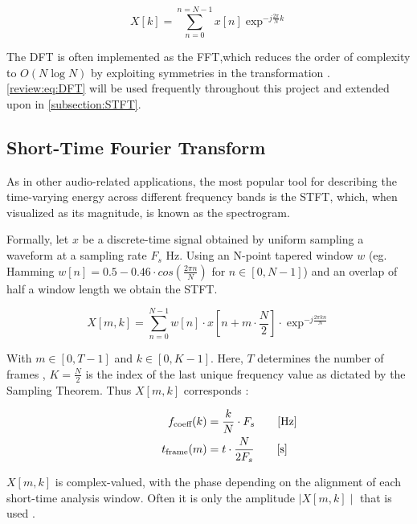 \begin{equation}
  X[k] =\sum_{n=0}^{n=N-1} x[n] \exp^{-j \frac{2 \pi}{N} k }
  \label{review:eq:DFT}
\end{equation}

The \ac{DFT} is often implemented as the \ac{FFT},which reduces the
order of complexity to $O(N\log{N})$ by exploiting symmetries in the
transformation \cite{OppenheimDSP}. \autoref{review:eq:DFT} will be used
frequently throughout this project and extended upon in
\autoref{subsection:STFT}.

\subsection{Short-Time Fourier Transform}
\label{subsection:STFT}

As in other audio-related applications, the most popular tool for describing the
time-varying energy across different frequency bands is the \ac{STFT}, which,
when visualized as its magnitude, is known as the spectrogram.

Formally, let $x$ be a discrete-time signal obtained by uniform sampling a
waveform at a sampling rate $F_{s}$ Hz. Using an N-point tapered window $w$ (eg.
Hamming $w[n] = 0.5-0.46\cdot cos(\frac{2\pi n}{N})$ for
$n\in\left[0,N-1\right]$) and an overlap of half a window length we obtain the
STFT.

\begin{equation}
  X [m,k] = \sum_{n=0}^{N-1}w[n]\cdot x[n + m\cdot\frac{N}{2}]\cdot \exp^{-j\frac{2\pi k n }{N}}
\end{equation}

With $m\in\left[0,T-1\right]$ and $k\in\left[0,K-1\right]$. Here, $T$ determines
the number of frames , $K = \frac{N}{2}$ is the index of the last unique
frequency value as dictated by the Sampling Theorem. Thus $X[m,k]$ corresponds :

\begin{equation}
  \begin{aligned}
    f_{\text{coeff}}(k) & = \frac{k}{N} \cdot F_{s} \mathrlap{\qquad [\si{\hertz}]}   \\
    t_{\text{frame}}(m) & = t \cdot \frac{N}{2F_{s}} \mathrlap{\qquad [\si{\second}]}
  \end{aligned}
  \label{review:eq:tradeoff}
\end{equation}

$X[m,k]$ is complex-valued, with the phase depending on the alignment of each
short-time analysis window. Often it is only the amplitude $\mid X[m,k] \mid$
that is used \cite{OppenheimDSP}.

